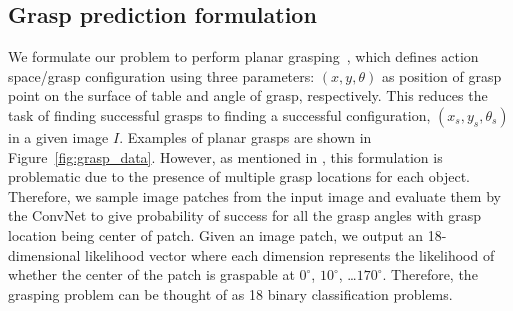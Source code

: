 \documentclass[letterpaper, 10 pt, conference]{ieeeconf}  %
\begin{document}
\subsection{Grasp prediction formulation} 
We formulate our problem to perform planar grasping~\cite{pinto2016supersizing}, which defines action space/grasp configuration using three parameters: $(x,y,\theta)$ as position of grasp point on the surface of table and angle of grasp, respectively. This reduces the task of finding successful grasps to finding a successful configuration, $(x_s,y_s,\theta_s)$ in a given image $I$. Examples of planar grasps are shown in Figure~\ref{fig:grasp_data}. However, as mentioned in \cite{pinto2016supersizing}, this formulation is problematic due to the presence of multiple grasp locations for each object. Therefore, we sample image patches from the input image and evaluate them by the ConvNet to give probability of success for all the grasp angles with grasp location being center of patch.
Given an image patch, we output an 18-dimensional likelihood vector where each dimension represents the likelihood of whether the center of the patch is graspable at $0^{\circ}$, $10^{\circ}$, \dots$170^{\circ}$. Therefore, the grasping problem can be thought of as 18 binary classification problems. 
\end{document}
